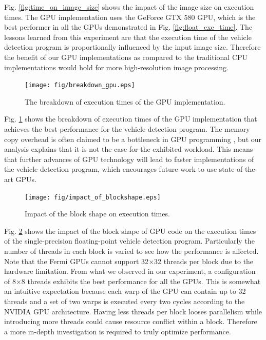 Fig. \ref{fig:time_on_image_size} shows the impact of the image size on
execution times. 
The GPU implementation uses the GeForce GTX 580 GPU, which is the best
performer in all the GPUs demonstrated in Fig. \ref{fig:float_exe_time}.
The lessons learned from this experiment are that the execution time of
the vehicle detection program is proportionally influenced by the input
image size.
Therefore the benefit of our GPU implementations as compared to the
traditional CPU implementations would hold for more high-resolution
image processing.

\begin{figure}[t]
 \begin{center}
  \texttt{[image: fig/breakdown\_gpu.eps]}\\
  \caption{The breakdown of execution times of the GPU implementation.}
  \label{fig:breakdown_gpu}
 \end{center}
\end{figure}

Fig. \ref{fig:breakdown_gpu} shows the breakdown of execution times of
the GPU implementation that achieves the best performance for the
vehicle detection program.
The memory copy overhead is often claimed to be a bottleneck in GPU
programming \cite{Jablin_PLDI11}, but our analysis explains that it is
not the case for the exhibited workload.
This means that further advances of GPU technology will lead to faster
implementations of the vehicle detection program, which encourages
future work to use state-of-the-art GPUs.

\begin{figure}[t]
 \begin{center}
  \texttt{[image: fig/impact\_of\_blockshape.eps]}\\
  \caption{Impact of the block shape on execution times.}
  \label{fig:impact_of_blockshape}
 \end{center}
\end{figure}

Fig. \ref{fig:impact_of_blockshape} shows the impact of the block shape
of GPU code on the execution times of the single-precision
floating-point vehicle detection program.
Particularly the number of threads in each block is varied to see how
the performance is affected.
Note that the Fermi GPUs cannot support 32$\times$32 threads per block
due to the hardware limitation.
From what we observed in our experiment, a configuration of 8$\times$8
threads exhibits the best performance for all the GPUs.
This is somewhat an intuitive expectation because each warp of the GPU
can contain up to 32 threads and a set of two warps is executed every
two cycles according to the NVIDIA GPU architecture.
Having less threads per block looses parallelism while introducing more
threads could cause resource conflict within a block.
Therefore a more in-depth investigation is required to truly optimize
performance.
